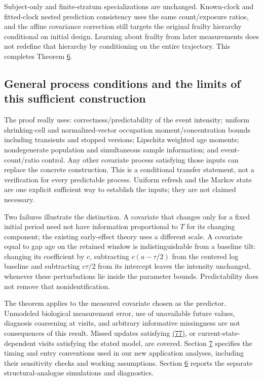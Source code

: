 \documentclass[11pt]{article}
\begin{document}
Subject-only and finite-stratum specializations are unchanged. Known-clock and fitted-clock nested prediction consistency uses the same count/exposure ratios, and the affine covariance correction still targets the original frailty hierarchy conditional on initial design. Learning about frailty from later measurements does not redefine that hierarchy by conditioning on the entire trajectory. This completes Theorem \hyperref[res:Theorem-6]{6}.

\subsection{General process conditions and the limits of this sufficient construction}\label{sec:I.6}

The proof really uses: correctness/predictability of the event intensity; uniform shrinking-cell and normalized-vector occupation moment/concentration bounds including transients and stopped versions; Lipschitz weighted age moments; nondegenerate population and simultaneous sample information; and event-count/ratio control. Any other covariate process satisfying those inputs can replace the concrete construction. This is a conditional transfer statement, not a verification for every predictable process. Uniform refresh and the Markov state are one explicit sufficient way to establish the inputs; they are not claimed necessary.

Two failures illustrate the distinction. A covariate that changes only for a fixed initial period need not have information proportional to \(T\) for its changing component; the existing early-effect theory uses a different scale. A covariate equal to gap age on the retained window is indistinguishable from a baseline tilt: changing its coefficient by \(c\), subtracting \(c(a-\tau/2)\) from the centered log baseline and subtracting \(c\tau/2\) from its intercept leaves the intensity unchanged, whenever these perturbations lie inside the parameter bounds. Predictability does not remove that nonidentification.

The theorem applies to the measured covariate chosen as the predictor. Unmodeled biological measurement error, use of unavailable future values, diagnosis coarsening at visits, and arbitrary informative missingness are not consequences of this result. Missed updates satisfying \hyperref[eq:77]{(77)}, or current-state-dependent visits satisfying the stated model, are covered. Section \hyperref[sec:7]{7} specifies the timing and entry conventions used in our new application analyses, including their sensitivity checks and working assumptions. Section \hyperref[sec:6]{6} reports the separate structural-analogue simulations and diagnostics.
\end{document}
